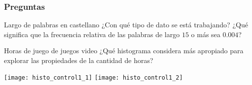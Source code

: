 \documentclass[table]{beamer}
\begin{document}
\begin{frame}
    \frametitle{Preguntas}
    \begin{exampleblock}{Largo de palabras en castellano}
        \small
        ¿Con qué tipo de dato se está trabajando? ¿Qué significa que la frecuencia relativa de las palabras de largo $15$ o más sea $0.004$?
        \begin{center}
        \end{center}
    \end{exampleblock}
    \begin{exampleblock}{Horas de juego de juegos video}
        \small
        ¿Qué histograma considera más apropiado para explorar las propiedades de la cantidad de horas?
        \begin{center}
    \texttt{[image: histo\_control1\_1]}
    \texttt{[image: histo\_control1\_2]}
        \end{center}
    \end{exampleblock}
\end{frame}
\end{document}
